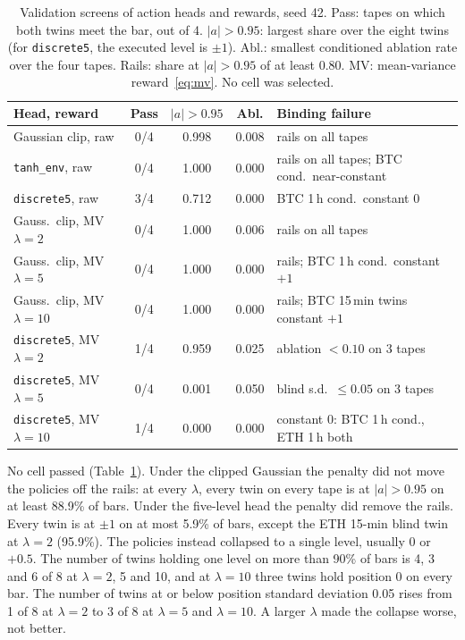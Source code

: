 \documentclass[conference]{IEEEtran}
\begin{document}
\begin{table}[!htb]
\caption{Validation screens of action heads and rewards, seed 42. Pass: tapes on which both twins meet the bar, out of 4. $|a|{>}0.95$: largest share over the eight twins (for \texttt{discrete5}, the executed level is $\pm1$). Abl.: smallest conditioned ablation rate over the four tapes. Rails: share at $|a|>0.95$ of at least 0.80. MV: mean-variance reward~\eqref{eq:mv}. No cell was selected.}
\label{tab:screen}
\centering
\footnotesize
\setlength{\tabcolsep}{2.6pt}
\begin{tabular}{@{}lcccp{2.75cm}@{}}
\toprule
Head, reward & Pass & $|a|{>}0.95$ & Abl. & Binding failure\\
\midrule
Gaussian clip, raw & 0/4 & 0.998 & 0.008 & rails on all tapes\\
\texttt{tanh\_env}, raw & 0/4 & 1.000 & 0.000 & rails on all tapes; BTC cond.\ near-constant\\
\texttt{discrete5}, raw & 3/4 & 0.712 & 0.000 & BTC 1\,h cond.\ constant 0\\
\midrule
Gauss.\ clip, MV $\lambda{=}2$ & 0/4 & 1.000 & 0.006 & rails on all tapes\\
Gauss.\ clip, MV $\lambda{=}5$ & 0/4 & 1.000 & 0.000 & rails; BTC 1\,h cond.\ constant $+1$\\
Gauss.\ clip, MV $\lambda{=}10$ & 0/4 & 1.000 & 0.000 & rails; BTC 15\,min twins constant $+1$\\
\midrule
\texttt{discrete5}, MV $\lambda{=}2$ & 1/4 & 0.959 & 0.025 & ablation $<0.10$ on 3 tapes\\
\texttt{discrete5}, MV $\lambda{=}5$ & 0/4 & 0.001 & 0.050 & blind s.d.\ $\le0.05$ on 3 tapes\\
\texttt{discrete5}, MV $\lambda{=}10$ & 1/4 & 0.000 & 0.000 & constant 0: BTC 1\,h cond., ETH 1\,h both\\
\bottomrule
\end{tabular}
\end{table}

No cell passed (Table~\ref{tab:screen}). Under the clipped Gaussian the penalty did not move the policies off the rails: at every $\lambda$, every twin on every tape is at $|a|>0.95$ on at least 88.9\% of bars. Under the five-level head the penalty did remove the rails. Every twin is at $\pm1$ on at most 5.9\% of bars, except the ETH 15-min blind twin at $\lambda=2$ (95.9\%). The policies instead collapsed to a single level, usually 0 or $+0.5$. The number of twins holding one level on more than 90\% of bars is 4, 3 and 6 of 8 at $\lambda=2$, 5 and 10, and at $\lambda=10$ three twins hold position 0 on every bar. The number of twins at or below position standard deviation 0.05 rises from 1 of 8 at $\lambda=2$ to 3 of 8 at $\lambda=5$ and $\lambda=10$. A larger $\lambda$ made the collapse worse, not better.
\end{document}
